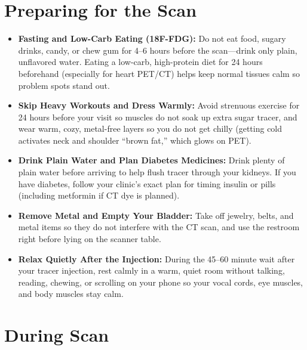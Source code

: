 \section{Preparing for the Scan}

\begin{itemize}
    \item \textbf{Fasting and Low-Carb Eating (18F-FDG):} Do not eat food, sugary drinks, candy, or chew gum for 4--6 hours before the scan---drink only plain, unflavored water. Eating a low-carb, high-protein diet for 24 hours beforehand (especially for heart PET/CT) helps keep normal tissues calm so problem spots stand out.
    \item \textbf{Skip Heavy Workouts and Dress Warmly:} Avoid strenuous exercise for 24 hours before your visit so muscles do not soak up extra sugar tracer, and wear warm, cozy, metal-free layers so you do not get chilly (getting cold activates neck and shoulder ``brown fat,'' which glows on PET).
    \item \textbf{Drink Plain Water and Plan Diabetes Medicines:} Drink plenty of plain water before arriving to help flush tracer through your kidneys. If you have diabetes, follow your clinic's exact plan for timing insulin or pills (including metformin if CT dye is planned).
    \item \textbf{Remove Metal and Empty Your Bladder:} Take off jewelry, belts, and metal items so they do not interfere with the CT scan, and use the restroom right before lying on the scanner table.
    \item \textbf{Relax Quietly After the Injection:} During the 45--60 minute wait after your tracer injection, rest calmly in a warm, quiet room without talking, reading, chewing, or scrolling on your phone so your vocal cords, eye muscles, and body muscles stay calm.
\end{itemize}

\section{During Scan}

